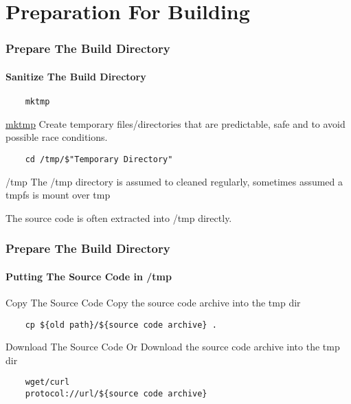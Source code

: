 \documentclass[1pt,hyperref={pdfpagelabels=true}]{beamer}
\begin{document}
\section{Preparation For Building}

\begin{frame}[fragile]
  \frametitle{Prepare The Build Directory}
  \framesubtitle{Sanitize The Build Directory}

  \begin{lstlisting}
    mktmp
  \end{lstlisting}
   
  \begin{alertblock}{\href{http://unixhelp.ed.ac.uk/CGI/man-cgi?mktemp}{mktmp}}
    Create temporary files/directories that are predictable, safe and to avoid
    possible race conditions.
  \end{alertblock}
  
  \pause
  
  \begin{lstlisting}
    cd /tmp/$"Temporary Directory"
  \end{lstlisting}
  
  \begin{alertblock}{/tmp}
    The /tmp directory is assumed to cleaned regularly, sometimes assumed a
    tmpfs is mount over tmp
    
    The source code is often extracted into /tmp directly.
  \end{alertblock}
  
\end{frame}

\begin{frame}[fragile]
  \frametitle{Prepare The Build Directory}
  \framesubtitle{Putting The Source Code in /tmp}
  
  \begin{block}{Copy The Source Code}
    Copy the source code archive into the tmp dir
  \end{block}
  
  \pause
  
  \begin{lstlisting}
    cp ${old path}/${source code archive} .
  \end{lstlisting}
  
  \pause
  
  \begin{block}{Download The Source Code}
    Or Download the source code archive into the tmp dir
  \end{block}
  
  \pause
  
  \begin{lstlisting}
    wget/curl
    protocol://url/${source code archive}
  \end{lstlisting}
  
\end{frame}
\end{document}
